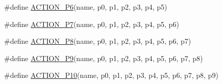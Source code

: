 \begin{DoxyCompactItemize}
\item 
\#define \hyperlink{gmock-generated-actions_8h_a3a8af72f23167873fcd5fc7476a4fabc}{A\+C\+T\+I\+O\+N\+\_\+\+P6}(name,  p0,  p1,  p2,  p3,  p4,  p5)
\item 
\#define \hyperlink{gmock-generated-actions_8h_a82d96846bae4fee8432385fd24b0a7ee}{A\+C\+T\+I\+O\+N\+\_\+\+P7}(name,  p0,  p1,  p2,  p3,  p4,  p5,  p6)
\item 
\#define \hyperlink{gmock-generated-actions_8h_a150147ecae8b84107be8575e4b2560cc}{A\+C\+T\+I\+O\+N\+\_\+\+P8}(name,  p0,  p1,  p2,  p3,  p4,  p5,  p6,  p7)
\item 
\#define \hyperlink{gmock-generated-actions_8h_a6a38804f2dce3fa758335676b4c26cda}{A\+C\+T\+I\+O\+N\+\_\+\+P9}(name,  p0,  p1,  p2,  p3,  p4,  p5,  p6,  p7,  p8)
\item 
\#define \hyperlink{gmock-generated-actions_8h_aff3ff3b23965dd03539aa4cbc5181002}{A\+C\+T\+I\+O\+N\+\_\+\+P10}(name,  p0,  p1,  p2,  p3,  p4,  p5,  p6,  p7,  p8,  p9)
\end{DoxyCompactItemize}
